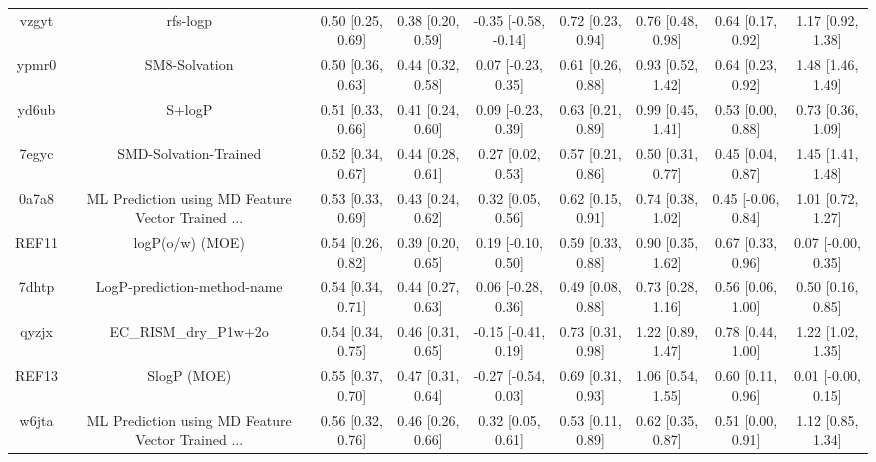 \documentclass{article}
\begin{document}
\begin{center}
\begin{longtable}{|ccccccccc|}
 vzgyt &                                           rfs-logp &  0.50 [0.25, 0.69] &  0.38 [0.20, 0.59] &  -0.35 [-0.58, -0.14] &  0.72 [0.23, 0.94] &    0.76 [0.48, 0.98] &    0.64 [0.17, 0.92] &     1.17 [0.92, 1.38] \\
 ypmr0 &                                      SM8-Solvation &  0.50 [0.36, 0.63] &  0.44 [0.32, 0.58] &    0.07 [-0.23, 0.35] &  0.61 [0.26, 0.88] &    0.93 [0.52, 1.42] &    0.64 [0.23, 0.92] &     1.48 [1.46, 1.49] \\
 yd6ub &                                             S+logP &  0.51 [0.33, 0.66] &  0.41 [0.24, 0.60] &    0.09 [-0.23, 0.39] &  0.63 [0.21, 0.89] &    0.99 [0.45, 1.41] &    0.53 [0.00, 0.88] &     0.73 [0.36, 1.09] \\
 7egyc &                              SMD-Solvation-Trained &  0.52 [0.34, 0.67] &  0.44 [0.28, 0.61] &     0.27 [0.02, 0.53] &  0.57 [0.21, 0.86] &    0.50 [0.31, 0.77] &    0.45 [0.04, 0.87] &     1.45 [1.41, 1.48] \\
 0a7a8 &  ML Prediction using MD Feature Vector Trained ... &  0.53 [0.33, 0.69] &  0.43 [0.24, 0.62] &     0.32 [0.05, 0.56] &  0.62 [0.15, 0.91] &    0.74 [0.38, 1.02] &   0.45 [-0.06, 0.84] &     1.01 [0.72, 1.27] \\
 REF11 &                                    logP(o/w) (MOE) &  0.54 [0.26, 0.82] &  0.39 [0.20, 0.65] &    0.19 [-0.10, 0.50] &  0.59 [0.33, 0.88] &    0.90 [0.35, 1.62] &    0.67 [0.33, 0.96] &    0.07 [-0.00, 0.35] \\
 7dhtp &                        LogP-prediction-method-name &  0.54 [0.34, 0.71] &  0.44 [0.27, 0.63] &    0.06 [-0.28, 0.36] &  0.49 [0.08, 0.88] &    0.73 [0.28, 1.16] &    0.56 [0.06, 1.00] &     0.50 [0.16, 0.85] \\
 qyzjx &                              EC\_RISM\_dry\_P1w+2o &  0.54 [0.34, 0.75] &  0.46 [0.31, 0.65] &   -0.15 [-0.41, 0.19] &  0.73 [0.31, 0.98] &    1.22 [0.89, 1.47] &    0.78 [0.44, 1.00] &     1.22 [1.02, 1.35] \\
 REF13 &                                        SlogP (MOE) &  0.55 [0.37, 0.70] &  0.47 [0.31, 0.64] &   -0.27 [-0.54, 0.03] &  0.69 [0.31, 0.93] &    1.06 [0.54, 1.55] &    0.60 [0.11, 0.96] &    0.01 [-0.00, 0.15] \\
 w6jta &  ML Prediction using MD Feature Vector Trained ... &  0.56 [0.32, 0.76] &  0.46 [0.26, 0.66] &     0.32 [0.05, 0.61] &  0.53 [0.11, 0.89] &    0.62 [0.35, 0.87] &    0.51 [0.00, 0.91] &     1.12 [0.85, 1.34] \\

\end{longtable}
\end{center}
\end{document}
